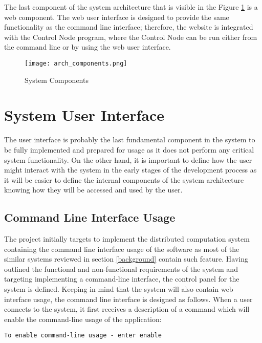 \documentclass[10pt]{report}
\begin{document}
The last component of the system architecture that is visible in the Figure \ref{fig:comps} is a web component. The web user interface is designed to provide the same functionality as the command line interface; therefore, the website is integrated with the Control Node program, where the Control Node can be run either from the command line or by using the web user interface.

\begin{figure}[htp]
    \centering
    \texttt{[image: arch\_components.png]}
    \caption{System Components}
    \label{fig:comps}
\end{figure}


\section{System User Interface}

The user interface is probably the last fundamental component in the system to be fully implemented and prepared for usage as it does not perform any critical system functionality. On the other hand, it is important to define how the user might interact with the system in the early stages of the development process as it will be easier to define the internal components of the system architecture knowing how they will be accessed and used by the user.


\subsection{Command Line Interface Usage}

The project initially targets to implement the distributed computation system containing the command line interface usage of the software as most of the similar systems reviewed in section \ref{background} contain such feature. Having outlined the functional and non-functional requirements of the system and targeting implementing a command-line interface, the control panel for the system is defined. Keeping in mind that the system will also contain web interface usage, the command line interface is designed as follows. When a user connects to the system, it first receives a description of a command which will enable the command-line usage of the application:

\begin{lstlisting}[style=DOS]
    To enable command-line usage - enter enable
\end{lstlisting}
\end{document}
